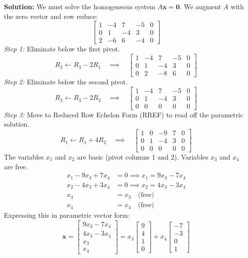 \documentclass[11pt]{article}
\begin{document}
\textbf{Solution:}
We must solve the homogeneous system $A\mathbf{x} = \mathbf{0}$. We augment $A$ with the zero vector and row reduce:
\[ \left[ \begin{array}{cccc|c} 1 & -4 & 7 & -5 & 0 \\ 0 & 1 & -4 & 3 & 0 \\ 2 & -6 & 6 & -4 & 0 \end{array} \right] \]
\textit{Step 1:} Eliminate below the first pivot.
\[ R_3 \leftarrow R_3 - 2R_1 \quad \implies \quad \left[ \begin{array}{cccc|c} 1 & -4 & 7 & -5 & 0 \\ 0 & 1 & -4 & 3 & 0 \\ 0 & 2 & -8 & 6 & 0 \end{array} \right] \]
\textit{Step 2:} Eliminate below the second pivot.
\[ R_3 \leftarrow R_3 - 2R_2 \quad \implies \quad \left[ \begin{array}{cccc|c} 1 & -4 & 7 & -5 & 0 \\ 0 & 1 & -4 & 3 & 0 \\ 0 & 0 & 0 & 0 & 0 \end{array} \right] \]
\textit{Step 3:} Move to Reduced Row Echelon Form (RREF) to read off the parametric solution.
\[ R_1 \leftarrow R_1 + 4R_2 \quad \implies \quad \left[ \begin{array}{cccc|c} 1 & 0 & -9 & 7 & 0 \\ 0 & 1 & -4 & 3 & 0 \\ 0 & 0 & 0 & 0 & 0 \end{array} \right] \]
The variables $x_1$ and $x_2$ are basic (pivot columns 1 and 2). Variables $x_3$ and $x_4$ are free.
\begin{align*}
    x_1 - 9x_3 + 7x_4 &= 0 \implies x_1 = 9x_3 - 7x_4 \\
    x_2 - 4x_3 + 3x_4 &= 0 \implies x_2 = 4x_3 - 3x_4 \\
    x_3 &= x_3 \quad \text{(free)} \\
    x_4 &= x_4 \quad \text{(free)}
\end{align*}
Expressing this in parametric vector form:
\[ \mathbf{x} = \begin{bmatrix} 9x_3 - 7x_4 \\ 4x_3 - 3x_4 \\ x_3 \\ x_4 \end{bmatrix} = x_3\begin{bmatrix} 9 \\ 4 \\ 1 \\ 0 \end{bmatrix} + x_4\begin{bmatrix} -7 \\ -3 \\ 0 \\ 1 \end{bmatrix} \]
\end{document}
